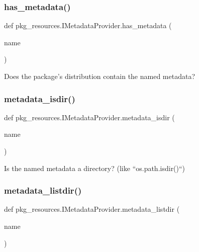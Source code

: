 \subsubsection{\texorpdfstring{has\+\_\+metadata()}{has\_metadata()}}
{\footnotesize\ttfamily def pkg\+\_\+resources.\+I\+Metadata\+Provider.\+has\+\_\+metadata (\begin{DoxyParamCaption}\item[{}]{name }\end{DoxyParamCaption})}

\begin{DoxyVerb}Does the package's distribution contain the named metadata?\end{DoxyVerb}
 \mbox{\label{classpkg__resources_1_1IMetadataProvider_a00c65f8e870e2a8917366c2ccb4d3ef6}} 
\subsubsection{\texorpdfstring{metadata\+\_\+isdir()}{metadata\_isdir()}}
{\footnotesize\ttfamily def pkg\+\_\+resources.\+I\+Metadata\+Provider.\+metadata\+\_\+isdir (\begin{DoxyParamCaption}\item[{}]{name }\end{DoxyParamCaption})}

\begin{DoxyVerb}Is the named metadata a directory?  (like ``os.path.isdir()``)\end{DoxyVerb}
 \mbox{\label{classpkg__resources_1_1IMetadataProvider_aa64f54075780aff08c98542a4883b3be}} 
\subsubsection{\texorpdfstring{metadata\+\_\+listdir()}{metadata\_listdir()}}
{\footnotesize\ttfamily def pkg\+\_\+resources.\+I\+Metadata\+Provider.\+metadata\+\_\+listdir (\begin{DoxyParamCaption}\item[{}]{name }\end{DoxyParamCaption})}

